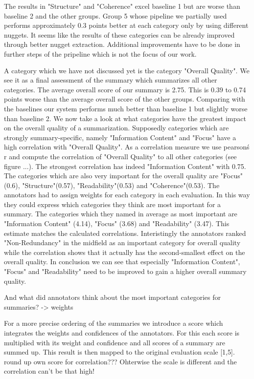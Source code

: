 The results in "Structure" and "Coherence" excel baseline 1 but are worse than baseline 2 and the other groups. Group 5 whose pipeline we partially used performs approximately 0.3 points better at each category only by using different nuggets. It seems like the results of these categories can be already improved through better nugget extraction. Additional improvements have to be done in further steps of the pripeline which is not the focus of our work.

A category which we have not discussed yet is the category "Overall Quality". We see it as a final assessment of the summary which summarizes all other categories. The average overall score of our summary is 2.75. This is 0.39 to 0.74 points worse than the average overall score of the other groups. Comparing with the baselines our system performs much better than baseline 1 but slightly worse than baseline 2. We now take a look at what categories have the greatest impact on the overall quality of a summarization. Supposedly categories which are strongly summary-specific, namely "Information Content" and "Focus" have a high correlation with "Overall Quality". As a correlation measure we use pearson\'s r and compute the correlation of "Overall Quality" to all other categories (see figure ...). The strongest correlation has indeed "Information Content" with 0.75. The categories which are also very important for the overall quality are "Focus"(0.6), "Structure"(0.57), "Readability"(0.53) and "Coherence"(0.53). The annotators had to assign weights for each category in each evaluation. In this way they could express which categories they think are most important for a summary. The categories which they named in average as most important are "Information Content" (4.14), "Focus" (3.68) and "Readability" (3.47). This estimate matches the calculated correlations. Interistingly the annotators ranked "Non-Redundancy" in the midfield as an important category for overall quality while the correlation shows that it actually has the second-smallest effect on the overall quality. In conclusion we can see that especially "Information Content", "Focus" and "Readability" need to be improved to gain a higher overall summary quality.

And what did annotators think about the most important categories for summaries? -> weights

For a more precise ordering of the summaries we introduce a score which integrates the weights and confidences of the annotators. For this each score is multiplied with its weight and confidence and all scores of a summary are summed up. This result is then mapped to the original evaluation scale [1,5].  round up own score for correlation??? Ohterwise the scale is different and the correlation can't be that high! 
